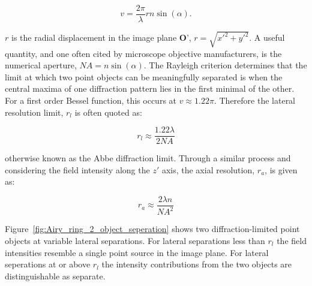 \begin{equation}\label{eq:normalised_lateral}
v = \frac{2\pi}{\lambda}rn\sin(\alpha).
\end{equation}

$r$ is the radial displacement in the image plane $\textbf{O'}$, $r = \sqrt{x'^{2} + y'^{2}}$. 
A useful quantity, and one often cited by microscope objective manufacturers, 
is the numerical aperture, $NA = n\sin(\alpha)$. The Rayleigh criterion 
determines that the limit at which two point objects can be meaningfully 
separated is when the central maxima of one diffraction pattern lies in the
first minimal of the other\cite{rayleigh1874xii,rayleigh1880investigations}. For a first order Bessel 
function, this occurs at $v \approx 1.22\pi$. Therefore the lateral resolution 
limit, $r_l$ is often quoted as:

\begin{equation}\label{eq:lateral_res}
r_l \approx \frac{1.22\lambda}{2NA}
\end{equation}

otherwise known as the Abbe diffraction limit\cite{abbe1873beitrage}. Through
a similar process and considering the field intensity along the $z'$ axis, the
axial resolution, $r_a$, is given as\cite{pawley2006handbook}:

\begin{equation}\label{eq:axial_res}
	r_a \approx \frac{2\lambda n}{NA^{2}}
\end{equation}

Figure~\ref{fig:Airy_ring_2_object_seperation} shows two 
diffraction-limited point objects at variable lateral separations. For 
lateral separations less than $r_{l}$ the field intensities resemble a single 
point source in the image plane. For lateral seperations at or above $r_{l}$ 
the intensity contributions from the two objects are distinguishable as 
separate.

